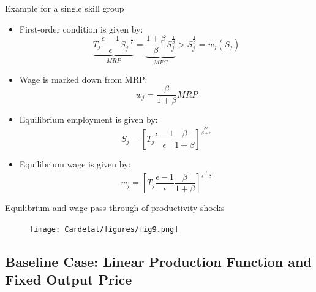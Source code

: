 \documentclass[notes=show]{beamer}
\begin{document}
\begin{frame}{Example for a single skill group}
\begin{itemize}
\item First-order condition is given by:
\begin{equation*}
    \underbrace{T_{j}\frac{\epsilon - 1}{\epsilon} S_{j}^{-\frac{1}{\epsilon}}}_{MRP} = \underbrace{\frac{1 + \beta}{\beta} S_{j}^{\frac{1}{\beta}}}_{MFC} > S_{j}^{\frac{1}{\beta}} = w_{j}(S_{j})
\end{equation*}
\item Wage is marked down from MRP:
\begin{equation*}
    w_{j} = \frac{\beta}{1+\beta} MRP
\end{equation*}
\item Equilibrium employment is given by:
\begin{equation*}
    S_{j} = \left[ T_{j} \frac{\epsilon - 1}{\epsilon} \frac{\beta}{1+\beta} \right]^{\frac{\beta \epsilon}{\beta + \epsilon}}
\end{equation*}
\item Equilibrium wage is given by:
\begin{equation*}
    w_{j} = \left[ T_{j} \frac{\epsilon-1}{\epsilon} \frac{\beta}{1+\beta} \right]^{\frac{\epsilon}{\epsilon+\beta}}
\end{equation*}
\end{itemize}
\end{frame}

\newpage
\begin{frame}{Equilibrium and wage pass-through of productivity shocks}
\begin{center}
\begin{figure}
\texttt{[image: Cardetal/figures/fig9.png]}
\end{figure} 
\end{center}
\end{frame}

\subsection*{Baseline Case: Linear Production Function and Fixed Output Price}
\end{document}
